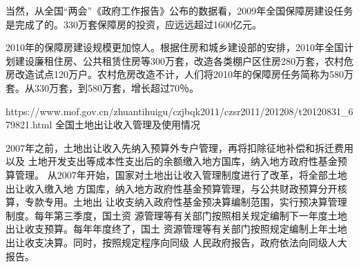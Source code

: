 当然，从全国“两会”《政府工作报告》公布的数据看，2009年全国保障房建设任务是完成了的。330万套保障房的投资，应远远超过1600亿元。

2010年的保障房建设规模更加惊人。根据住房和城乡建设部的安排，2010年全国计划建设廉租住房、公共租赁住房等300万套，改造各类棚户区住房280万套，农村危房改造试点120万户。农村危房改造不计，人们将2010年的保障房任务简称为580万套。从330万套，到580万套，增长超过70％。

https://www.mof.gov.cn/zhuantihuigu/czjbqk2011/czsr2011/201208/t20120831_679821.html
全国土地出让收入管理及使用情况

2007年之前，土地出让收入先纳入预算外专户管理，再将扣除征地补偿和拆迁费用以及
土地开发支出等成本性支出后的余额缴入地方国库，纳入地方政府性基金预算管理。
从2007年开始，国家对土地出让收入管理制度进行了改革，将全部土地出让收入缴入地
方国库，纳入地方政府性基金预算管理，与公共财政预算分开核算，专款专用。土地出
让收支纳入政府性基金预决算编制范围，实行预决算管理制度。每年第三季度，国土资
源管理等有关部门按照相关规定编制下一年度土地出让收支预算。每年年度终了，国土
资源管理等有关部门按照规定编制上年土地出让收支决算。同时，按照规定程序向同级
人民政府报告，政府依法向同级人大报告。

